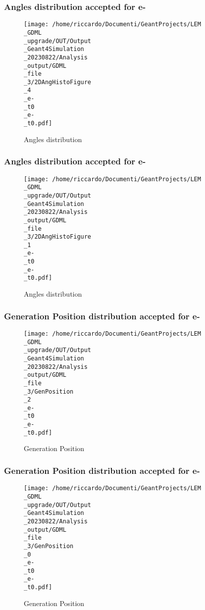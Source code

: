 \documentclass[8pt]{beamer}
\begin{document}
            \begin{frame}
                \frametitle{Angles distribution accepted for e-}
            
        \begin{figure}[h]
            \centering
            \texttt{[image: /home/riccardo/Documenti/GeantProjects/LEM\\\_GDML\\\_upgrade/OUT/Output\\\_Geant4Simulation\\\_20230822/Analysis\\\_output/GDML\\\_file\\\_3/2DAngHistoFigure\\\_4\\\_e-\\\_t0\\\_e-\\\_t0.pdf]}
            \caption{Angles distribution}
        \end{figure}
        
            \end{frame}
            
            \begin{frame}
                \frametitle{Angles distribution accepted for e-}
            
        \begin{figure}[h]
            \centering
            \texttt{[image: /home/riccardo/Documenti/GeantProjects/LEM\\\_GDML\\\_upgrade/OUT/Output\\\_Geant4Simulation\\\_20230822/Analysis\\\_output/GDML\\\_file\\\_3/2DAngHistoFigure\\\_1\\\_e-\\\_t0\\\_e-\\\_t0.pdf]}
            \caption{Angles distribution}
        \end{figure}
        
            \end{frame}
            
            \begin{frame}
                \frametitle{Generation Position distribution accepted for e-}
            
        \begin{figure}[h]
            \centering
            \texttt{[image: /home/riccardo/Documenti/GeantProjects/LEM\\\_GDML\\\_upgrade/OUT/Output\\\_Geant4Simulation\\\_20230822/Analysis\\\_output/GDML\\\_file\\\_3/GenPosition\\\_2\\\_e-\\\_t0\\\_e-\\\_t0.pdf]}
            \caption{Generation Position}
        \end{figure}
        
            \end{frame}
            
            \begin{frame}
                \frametitle{Generation Position distribution accepted for e-}
            
        \begin{figure}[h]
            \centering
            \texttt{[image: /home/riccardo/Documenti/GeantProjects/LEM\\\_GDML\\\_upgrade/OUT/Output\\\_Geant4Simulation\\\_20230822/Analysis\\\_output/GDML\\\_file\\\_3/GenPosition\\\_0\\\_e-\\\_t0\\\_e-\\\_t0.pdf]}
            \caption{Generation Position}
        \end{figure}
        
            \end{frame}
            
\end{document}
